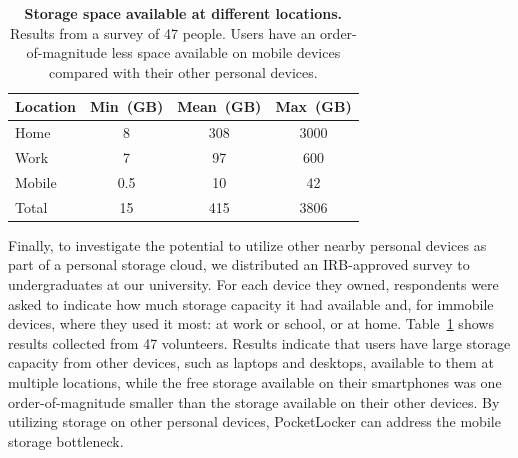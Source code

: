 \begin{table}[t]
{\small

\begin{tabularx}{\columnwidth}{Xccc}

\textbf{Location} & \textbf{Min~(GB)} & \textbf{Mean~(GB)} &
\textbf{Max~(GB)} \\ \toprule
Home & 8 & 308 & 3000 \\
Work & 7 & 97 & 600 \\
Mobile & 0.5 & 10 & 42 \\
Total & 15 & 415 & 3806 \\

\end{tabularx}
}

\caption{\small \textbf{Storage space available at different locations.}
Results from a survey of 47 people. Users have an order-of-magnitude less
space available on mobile devices compared with their other personal
devices.}

\label{table-storagesurvey}

\end{table}

Finally, to investigate the potential to utilize other nearby personal
devices as part of a personal storage cloud, we distributed an IRB-approved
survey to undergraduates at our university. For each device they owned,
respondents were asked to indicate how much storage capacity it had available
and, for immobile devices, where they used it most: at work or school, or at
home. Table~\ref{table-storagesurvey} shows results collected from 47
volunteers. Results indicate that users have large storage capacity from
other devices, such as laptops and desktops, available to them at multiple
locations, while the free storage available on their smartphones was one
order-of-magnitude smaller than the storage available on their other devices.
By utilizing storage on other personal devices, PocketLocker can address the
mobile storage bottleneck.
